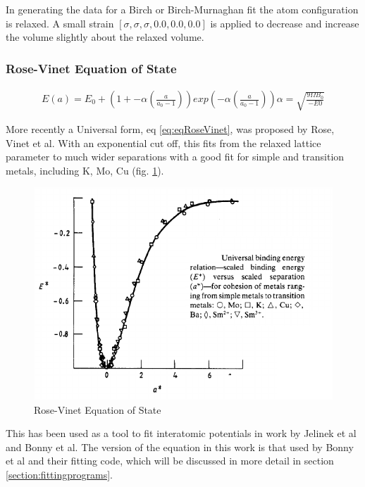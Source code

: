 In generating the data for a Birch or Birch-Murnaghan fit the atom configuration is relaxed.  A small strain $\left[\sigma, \sigma, \sigma, 0.0, 0.0, 0.0\right]$ is applied to decrease and increase the volume slightly about the relaxed volume.


\FloatBarrier
\subsubsection{Rose-Vinet Equation of State}
\label{section:rosevineteos}

\begin{equation}
\begin{split}
E(a) = E_0 + \left(1 + -\alpha \left(\frac{a}{a_0 - 1}\right)\right) exp\left(-\alpha \left(\frac{a}{a_0 - 1}\right)\right) 
\alpha = \sqrt{\frac{9 \Omega B_0}{-E0}}
\end{split}
\label{eq:eqRoseVinet}
\end{equation}

More recently a Universal form, eq \ref{eq:eqRoseVinet}, was proposed by Rose, Vinet et al\cite{rosevinet}.  With an exponential cut off, this fits from the relaxed lattice parameter to much wider separations with a good fit for simple and transition metals, including K, Mo, Cu (fig. \ref{fig:rosevinet}).

\begin{figure}[htbp]
  \begin{center}
    \includegraphics[width=.5\linewidth]{chapters/interatomic_potential_fitting/images/rosevinet.png}%
    \caption{Rose-Vinet Equation of State}
    \label{fig:rosevinet}
  \end{center}
\end{figure}

This has been used as a tool to fit interatomic potentials in work by Jelinek et al\cite{meamalsibaskes} and Bonny et al\cite{ipbonny}.  The version of the equation in this work is that used by Bonny et al and their fitting code, which will be discussed in more detail in section \ref{section:fittingprograms}.



